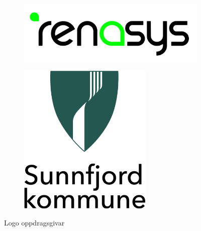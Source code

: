 \begin{figure}[htbp]
    \centering
    \begin{subfigure}[b]{0.3\textwidth}
        \centering
        \includegraphics[width=1\textwidth]{Bilder/renasys.png}
    \end{subfigure}
    \hfill
    \begin{subfigure}[b]{0.3\textwidth}
        \centering
        \includegraphics[width=0.7\textwidth]{Bilder/SK.png}
    \end{subfigure}
    \caption{Logo oppdragsgivar}\label{fig:Oppdragsgivar}
\end{figure}